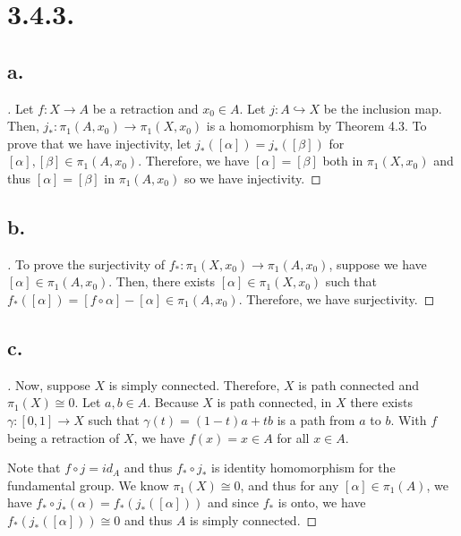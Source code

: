 \documentclass{article}
\begin{document}
\section*{3.4.3.}
\subsection*{a.}
\begin{proof}[\unskip\nopunct]
   Let $f:X \to A$ be a retraction and $x_0 \in A$. Let $j: A \hookrightarrow X$ be the inclusion map. Then, $j_*:\pi_1(A, x_0) \to \pi_1(X, x_0)$ is a homomorphism by Theorem 4.3. 
   To prove that we have injectivity, let $j_*([\alpha]) = j_*([\beta])$ for $[\alpha], [\beta] \in \pi_1(A, x_0)$. Therefore, we have $[\alpha] = [\beta]$ both in $\pi_1(X, x_0)$ and thus $[\alpha] = [\beta]$ in $\pi_1(A, x_0)$ so we have injectivity. 

\end{proof}
\subsection*{b.}
\begin{proof}[\unskip\nopunct]
   To prove the surjectivity of $f_*: \pi_1(X, x_0) \to \pi_1(A, x_0)$, suppose we have $[\alpha] \in \pi_1(A, x_0)$. Then, there exists $[\alpha] \in \pi_1(X, x_0)$ such that $f_*([\alpha]) = [f \circ \alpha] - [\alpha] \in \pi_1(A, x_0)$. Therefore, we have surjectivity. 
\end{proof}

\subsection*{c.}
\begin{proof}[\unskip\nopunct]
    Now, suppose $X$ is simply connected. Therefore, $X$ is path connected and $\pi_1(X) \cong 0$. Let $a, b \in A$. 
    Because $X$ is path connected, in $X$ there exists $\gamma:[0, 1] \to X$ such that $\gamma(t) = (1 - t)a + tb$ is a path from $a$ to $b$. 
    With $f$ being a retraction of $X$, we have $f(x) = x \in A$ for all $x \in A$. 

    Note that $f \circ j = id_A$ and thus $f_* \circ j_* $ is identity homomorphism for the fundamental group. We know $\pi_1(X) \cong 0$, and thus for any $[\alpha] \in \pi_1(A)$, we have $f_* \circ j_* (\alpha) = f_*(j_*([\alpha]))$ 
    and since $f_*$ is onto, we have $f_*(j_*([\alpha])) \cong 0$ and thus $A$ is simply connected.    

\end{proof}
\end{document}
